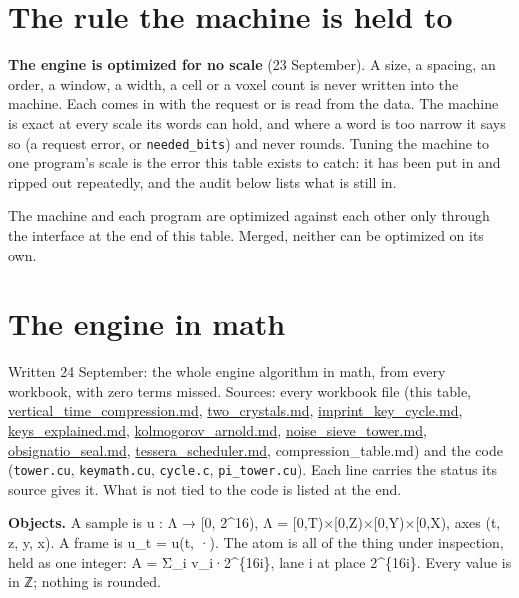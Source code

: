 \section{\texorpdfstring{The rule the machine is held to}{The rule the machine is held to}}

\textbf{The engine is optimized for no scale} (23 September). A size, a spacing, an order, a window, a width, a cell or a voxel count is never written into the machine. Each comes in with the request or is read from the data. The machine is exact at every scale its words can hold, and where a word is too narrow it says so (a request error, or \texttt{needed\_\allowbreak{}bits}) and never rounds. Tuning the machine to one program's scale is the error this table exists to catch: it has been put in and ripped out repeatedly, and the audit below lists what is still in.

The machine and each program are optimized against each other only through the interface at the end of this table. Merged, neither can be optimized on its own.

\section{\texorpdfstring{The engine in math}{The engine in math}}

Written 24 September: the whole engine algorithm in math, from every workbook, with zero terms missed. Sources: every workbook file (this table, \hyperref[chap:vertical-time-compression]{vertical\_\allowbreak{}time\_\allowbreak{}compression.md}, \hyperref[chap:two-crystals]{two\_\allowbreak{}crystals.md}, \hyperref[chap:imprint-key-cycle]{imprint\_\allowbreak{}key\_\allowbreak{}cycle.md}, \hyperref[chap:keys-explained]{keys\_\allowbreak{}explained.md}, \hyperref[chap:kolmogorov-arnold]{kolmogorov\_\allowbreak{}arnold.md}, \hyperref[chap:noise-sieve-tower]{noise\_\allowbreak{}sieve\_\allowbreak{}tower.md}, \hyperref[chap:obsignatio-seal]{obsignatio\_\allowbreak{}seal.md}, \hyperref[chap:tessera-scheduler]{tessera\_\allowbreak{}scheduler.md}, compression\_\allowbreak{}table.md) and the code (\texttt{tower.\allowbreak{}cu}, \texttt{keymath.\allowbreak{}cu}, \texttt{cycle.\allowbreak{}c}, \texttt{pi\_\allowbreak{}tower.\allowbreak{}cu}). Each line carries the status its source gives it. What is not tied to the code is listed at the end.

\textbf{Objects.} A sample is u : Λ → [0, 2\textasciicircum{}16), Λ = [0,T)×[0,Z)×[0,Y)×[0,X), axes (t, z, y, x). A frame is u\_\allowbreak{}t = u(t, ·). The atom is all of the thing under inspection, held as one integer: A = Σ\_\allowbreak{}i v\_\allowbreak{}i·2\textasciicircum{}\{16i\}, lane i at place 2\textasciicircum{}\{16i\}. Every value is in ℤ; nothing is rounded.

